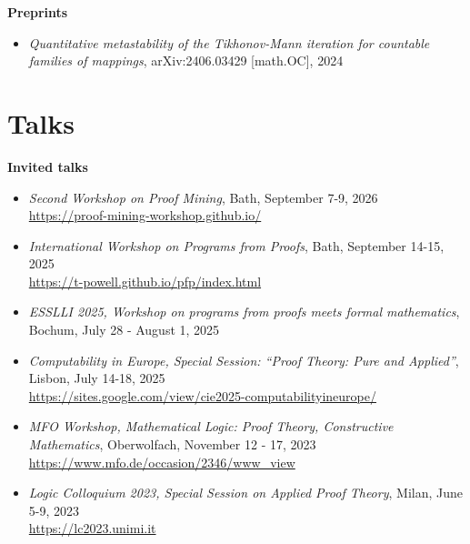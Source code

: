 \documentclass[letterpaper,11pt,oneside]{article}
\begin{document}
\textbf{Preprints}
\begin{itemize}
    \item \emph{Quantitative metastability of the Tikhonov-Mann iteration for countable families of mappings}, 	arXiv:2406.03429 [math.OC], 2024
\end{itemize}
\mbox{} 


\section{Talks}
\noindent
\large{\textbf{Invited talks}} 
\normalsize
\begin{itemize}
    \item \emph{Second Workshop on Proof Mining},
    Bath, September 7-9, 2026 \\ 
    \url{https://proof-mining-workshop.github.io/}
    \item \emph{International Workshop on Programs from Proofs}, 
    Bath, September 14-15, 2025 \\ 
    \url{https://t-powell.github.io/pfp/index.html}
    \item \emph{ESSLLI 2025, Workshop on programs from proofs meets formal mathematics},
    Bochum, July 28 - August 1, 2025 
    \item \emph{Computability in Europe, Special Session: ``Proof Theory: Pure and Applied''},
    Lisbon, July 14-18, 2025 \\ 
    \url{https://sites.google.com/view/cie2025-computabilityineurope/}
    \item \emph{MFO Workshop, Mathematical Logic: Proof Theory, Constructive Mathematics},
    Oberwolfach, November 12 - 17, 2023 \\ 
    \url{https://www.mfo.de/occasion/2346/www_view} 
    \item \emph{Logic Colloquium 2023, Special Session on Applied Proof Theory},
    Milan, June 5-9, 2023 \\ 
    \url{https://lc2023.unimi.it}
\end{itemize}
\normalsize
\mbox{}
\end{document}
